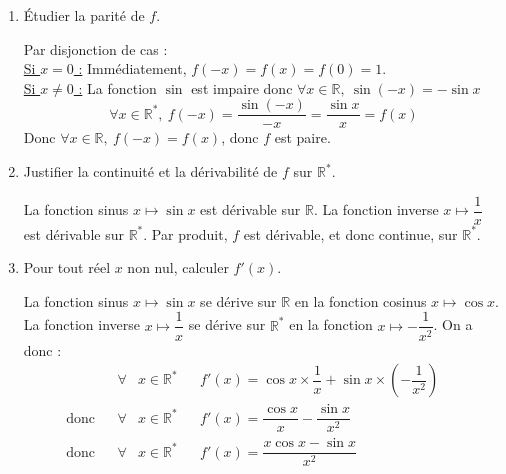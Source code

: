 \documentclass[a4paper,french,bookmarks]{article}
\begin{document}
\begin{enumerate}
\begin{enumerate}
    \item Étudier la parité de $f$.
    \begin{tcolorbox}[colback=black!3,colframe=black!9,boxrule=.25pt,enhanced,arc is angular,arc=0pt]
   Par disjonction de cas :\\
  \underline{Si $x = 0$ :} Immédiatement, $f\left(-x\right)=f\left(x\right)=f\left(0\right)=1$.
 \\
  \underline{Si $x \neq 0$ :} La fonction $\sin$ est impaire donc $\forall x \in \mathbb{R}, \ \sin\left(-x\right) = -\sin x$\\
  \[\forall x \in \mathbb{R}^*, \ f\left(-x\right) = \dfrac{\sin\left(-x\right)}{-x} = \dfrac{\sin x}{x} = f\left(x\right) \]
Donc $\forall x \in \mathbb{R}, \ f\left(-x\right) = f\left(x\right)$, donc $f$ est paire.
  \end{tcolorbox}
  
  \item Justifier la continuité et la dérivabilité de $f$ sur $\mathbb{R}^*$.
  
  \begin{tcolorbox}[colback=black!3,colframe=black!9,boxrule=.25pt,enhanced,arc is angular,arc=0pt]
  La fonction sinus $x \mapsto \sin x$ est dérivable sur $\mathbb{R}$. La fonction inverse $x \mapsto \dfrac{1}{x}$ est dérivable sur $\mathbb{R}^*$. Par produit, $f$ est dérivable, et donc continue, sur $\mathbb{R}^*$.
  \end{tcolorbox}
  
  \item Pour tout réel $x$ non nul, calculer $f'(x)$.
  
  \begin{tcolorbox}[colback=black!3,colframe=black!9,boxrule=.25pt,enhanced,arc is angular,arc=0pt]
  La fonction sinus $x \mapsto \sin x$ se dérive sur $\mathbb{R}$ en la fonction cosinus $x \mapsto \cos x$. La fonction inverse $x \mapsto \dfrac{1}{x}$ se dérive sur $\mathbb{R}^*$ en la fonction $x \mapsto -\dfrac{1}{x^2}$. On a donc : 
  \begin{align*}
      && \forall &x \in \mathbb{R}^* && f'\left(x\right) = \cos x \times \dfrac{1}{x} + \sin x \times \left(-\dfrac{1}{x^2}\right) &&\\
\text{donc} && \forall &x \in \mathbb{R}^* && f'\left(x\right) = \dfrac{\cos x}{x} - \dfrac{\sin x}{x^2}\\
\text{donc} && \forall &x \in \mathbb{R}^* && f'\left(x\right) = \dfrac{x\cos x - \sin x}{x^2}
  \end{align*}
  \end{tcolorbox}
  

\end{enumerate}
\end{enumerate}
\end{document}
